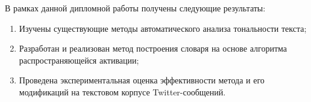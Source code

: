 \startconclusionpage

В рамках данной дипломной работы получены следующие результаты:

\begin{enumerate}
\item Изучены существующие методы автоматического анализа тональности текста;
\item Разработан и реализован метод построения словаря на основе алгоритма
  распространяющейся активации;
\item Проведена экспериментальная оценка эффективности метода и его модификаций
  на текстовом корпусе Twitter-сообщений.
\end{enumerate}

\FloatBarrier

